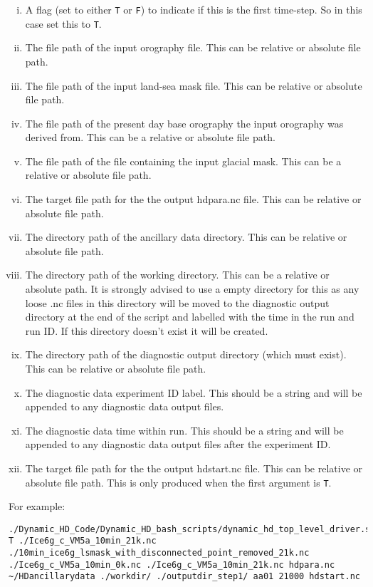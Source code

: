 \documentclass{article}
\begin{document}
\begin{enumerate}
\begin{enumerate}[i)]
\item A flag (set to either \texttt{T} or \texttt{F}) to indicate if this is the first time-step. So in this case set this to \texttt{T}.
\item The file path of the input orography file. This can be relative or absolute file path.
\item The file path of the input land-sea mask file. This can be relative or absolute file path.
\item The file path of the present day base orography the input orography was derived from. This can be a relative or absolute file path.
\item The file path of the file containing the input glacial mask. This can be a relative or absolute file path.
\item The target file path for the the output hdpara.nc file. This can be relative or absolute file path.
\item The directory path of the ancillary data directory. This can be relative or absolute file path.
\item The directory path of the working directory. This can be a relative or absolute path. It is strongly advised to use a empty directory for this as any loose .nc files in this directory will be moved to the diagnostic output directory at the end of the script and labelled with the time in the run and run ID. If this directory doesn't exist it will be created.
\item The directory path of the diagnostic output directory (which must exist). This can be relative or absolute file path.
\item The diagnostic data experiment ID label. This should be a string and will be appended to any diagnostic data output files.
\item The diagnostic data time within run. This should be a string and will be appended to any diagnostic data output files after the experiment ID.
\item The target file path for the the output hdstart.nc file. This can be relative or absolute file path. This is only produced when the first argument is  \texttt{T}.
\end{enumerate}
For example:
\begin{lstlisting}[style=bash_input,breaklines=true]
./Dynamic_HD_Code/Dynamic_HD_bash_scripts/dynamic_hd_top_level_driver.sh T ./Ice6g_c_VM5a_10min_21k.nc ./10min_ice6g_lsmask_with_disconnected_point_removed_21k.nc ./Ice6g_c_VM5a_10min_0k.nc ./Ice6g_c_VM5a_10min_21k.nc hdpara.nc ~/HDancillarydata ./workdir/ ./outputdir_step1/ aa01 21000 hdstart.nc

\end{lstlisting}
\end{enumerate}
\end{document}
